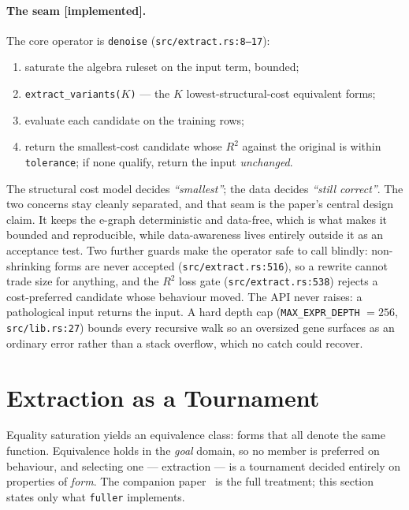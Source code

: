 \documentclass[sigconf]{acmart}
\begin{document}
\paragraph{The seam [implemented].} The core operator is \texttt{denoise}
(\texttt{src/extract.rs:8--17}):

\begin{enumerate}\itemsep2pt
\item saturate the algebra ruleset on the input term, bounded;
\item \texttt{extract\_variants($K$)} --- the $K$ lowest-structural-cost
      equivalent forms;
\item evaluate each candidate on the training rows;
\item return the smallest-cost candidate whose $R^2$ against the original is
      within \texttt{tolerance}; if none qualify, return the input
      \emph{unchanged}.
\end{enumerate}

The structural cost model decides \emph{``smallest''}; the data decides
\emph{``still correct''}. The two concerns stay cleanly separated, and that seam
is the paper's central design claim. It keeps the e-graph deterministic and
data-free, which is what makes it bounded and reproducible, while data-awareness
lives entirely outside it as an acceptance test. Two further guards make the
operator safe to call blindly: non-shrinking forms are never accepted
(\texttt{src/extract.rs:516}), so a rewrite cannot trade size for anything, and
the $R^2$ loss gate (\texttt{src/extract.rs:538}) rejects a cost-preferred
candidate whose behaviour moved. The API never raises: a pathological input
returns the input. A hard depth cap (\texttt{MAX\_EXPR\_DEPTH} $=256$,
\texttt{src/lib.rs:27}) bounds every recursive walk so an oversized gene surfaces
as an ordinary error rather than a stack overflow, which no catch could recover.

\section{Extraction as a Tournament}
\label{sec:extraction}

Equality saturation yields an equivalence class: forms that all denote the same
function. Equivalence holds in the \emph{goal} domain, so no member is preferred
on behaviour, and selecting one --- extraction --- is a tournament decided
entirely on properties of \emph{form}. The companion
paper~\cite{morgan2026tournaments} is the full treatment; this section states only
what \texttt{fuller} implements.
\end{document}
